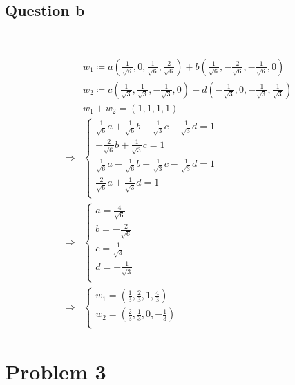 \documentclass{article}
\begin{document}
\subsection{Question b}

~

\begin{equation*}
    \begin{split}
        &w_1\coloneqq a(\frac{1}{\sqrt{6}},0,\frac{1}{\sqrt{6}},\frac{2}{\sqrt{6}})+b(\frac{1}{\sqrt{6}},-\frac{2}{\sqrt{6}},-\frac{1}{\sqrt{6}},0)\\
        &w_2\coloneqq c(\frac{1}{\sqrt{3}},\frac{1}{\sqrt{3}},-\frac{1}{\sqrt{3}},0)+d(-\frac{1}{\sqrt{3}},0,-\frac{1}{\sqrt{3}},\frac{1}{\sqrt{3}})\\
        &w_1+w_2=(1,1,1,1)\\
        \Rightarrow&\begin{cases}
            \frac{1}{\sqrt{6}}a+\frac{1}{\sqrt{6}}b+\frac{1}{\sqrt{3}}c-\frac{1}{\sqrt{3}}d=1\\
            -\frac{2}{\sqrt{6}}b+\frac{1}{\sqrt{3}}c=1\\
            \frac{1}{\sqrt{6}}a-\frac{1}{\sqrt{6}}b-\frac{1}{\sqrt{3}}c-\frac{1}{\sqrt{3}}d=1\\
            \frac{2}{\sqrt{6}}a+\frac{1}{\sqrt{3}}d=1\\
        \end{cases}\\
        \Rightarrow&\begin{cases}
            a=\frac{4}{\sqrt{6}}\\
            b=-\frac{2}{\sqrt{6}}\\
            c=\frac{1}{\sqrt{3}}\\
            d=-\frac{1}{\sqrt{3}}\\
        \end{cases}\\
        \Rightarrow&\begin{cases}
            w_1=(\frac{1}{3},\frac{2}{3},1,\frac{4}{3})\\
            w_2=(\frac{2}{3},\frac{1}{3},0,-\frac{1}{3})\\
        \end{cases}
    \end{split}
\end{equation*}

\newpage

\section{Problem 3}
\end{document}
